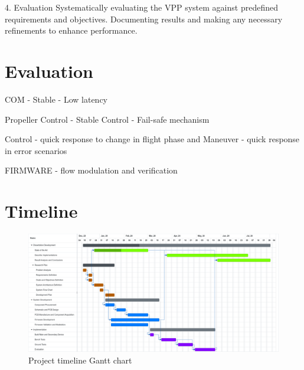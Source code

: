 4. Evaluation
Systematically evaluating the VPP system against predefined requirements and objectives.
Documenting results and making any necessary refinements to enhance performance.




\section{Evaluation}
COM
- Stable
- Low latency

Propeller Control
- Stable Control
- Fail-safe mechanism

Control
- quick response to change in flight phase and Maneuver
- quick response in error scenarios

FIRMWARE
- flow modulation and verification

\section{Timeline}



\begin{figure}[H]
    \centering
    \includegraphics[width=\textwidth,keepaspectratio]{ch5/assets/gantt.pdf}
    \caption{Project timeline Gantt chart}
    \label{gantt}
\end{figure}